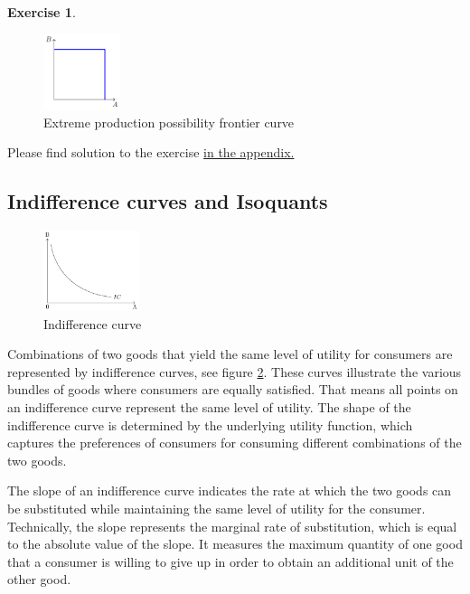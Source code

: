 \documentclass[
  12pt,
  oneside]{book}
\theoremstyle{definition}
\theoremstyle{definition}
\theoremstyle{definition}
\newtheorem{exercise}{Exercise}[chapter]
\theoremstyle{definition}
\theoremstyle{remark}
\begin{document}
\begin{exercise}
\begin{figure}
\centering
\includegraphics[width=0.2\textwidth,height=\textheight]{fig/ppf3.png}
\caption{\label{fig:ppf3} Extreme production possibility frontier curve}
\end{figure}

Please find solution to the exercise \hyperref[sol:Uproduction]{in the appendix.}

\subsection{Indifference curves and Isoquants}\label{indifference-curves-and-isoquants}

\begin{figure}
\centering
\includegraphics[width=0.25\textwidth,height=\textheight]{fig/ic1.png}
\caption{\label{fig:ic1} Indifference curve}
\end{figure}

Combinations of two goods that yield the same level of utility for consumers are represented by indifference curves, see figure \ref{fig:ic1}. These curves illustrate the various bundles of goods where consumers are equally satisfied. That means all points on an indifference curve represent the same level of utility. The shape of the indifference curve is determined by the underlying utility function, which captures the preferences of consumers for consuming different combinations of the two goods.

The slope of an indifference curve indicates the rate at which the two goods can be substituted while maintaining the same level of utility for the consumer. Technically, the slope represents the marginal rate of substitution, which is equal to the absolute value of the slope. It measures the maximum quantity of one good that a consumer is willing to give up in order to obtain an additional unit of the other good.


\end{exercise}
\end{document}

